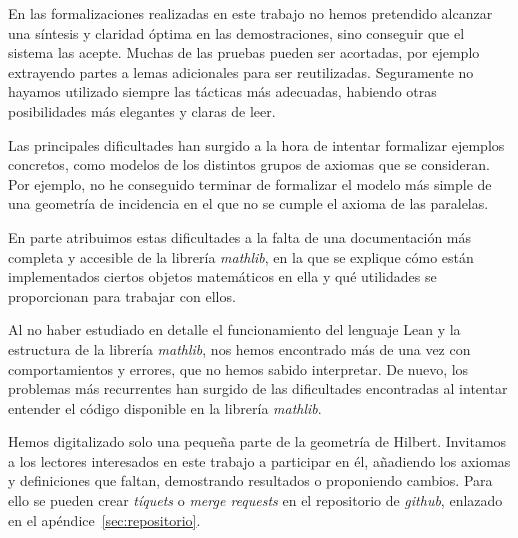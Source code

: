 En las formalizaciones realizadas en este trabajo no hemos pretendido alcanzar
una síntesis y claridad óptima en las demostraciones, sino conseguir que el
sistema las acepte. Muchas de las pruebas pueden ser acortadas, por ejemplo
extrayendo partes a lemas adicionales para ser reutilizadas. Seguramente no
hayamos utilizado siempre las tácticas más adecuadas, habiendo otras
posibilidades más elegantes y claras de leer.

Las principales dificultades han surgido a la hora de intentar formalizar
ejemplos concretos, como modelos de los distintos grupos de axiomas que se
consideran. Por ejemplo, no he conseguido terminar de formalizar el modelo más
simple de una geometría de incidencia en el que no se cumple el axioma de las
paralelas.

En parte atribuimos estas dificultades a la falta de una documentación más
completa y accesible de la librería \textit{mathlib}, en la que se explique cómo
están implementados ciertos objetos matemáticos en ella y qué utilidades se
proporcionan para trabajar con ellos.

Al no haber estudiado en detalle el funcionamiento del lenguaje Lean y
la estructura de la librería \textit{mathlib}, nos hemos encontrado más de una vez con
comportamientos y errores, que no hemos sabido interpretar. De nuevo, los
problemas más recurrentes han surgido de las dificultades encontradas al
intentar entender el código disponible en la librería \textit{mathlib}.

Hemos digitalizado solo una pequeña parte de la geometría de Hilbert. Invitamos
a los lectores interesados en este trabajo a participar en él, añadiendo los
axiomas y definiciones que faltan, demostrando resultados o proponiendo cambios.
Para ello se pueden crear \textit{tíquets} o \textit{merge requests} en el
repositorio de \textit{github}, enlazado en el apéndice~\ref{sec:repositorio}.





